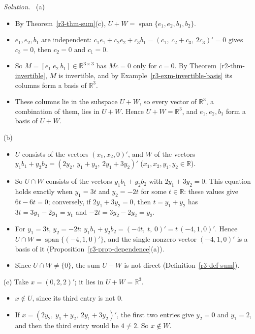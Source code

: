 \documentclass[12pt]{article}
\newcommand{\R}{\mathbb R}
\DeclareMathOperator{\Span}{span}
\theoremstyle{definition}
\newenvironment{solution}{\par\noindent\textit{Solution.}\ }{\par\smallskip}
\begin{document}
\begin{solution}
(a)
\begin{itemize}
\item By Theorem~\ref{r3-thm-sum}(c), \(U+W=\Span\{e_1,e_2,b_1,b_2\}\).
\item \(e_1,e_2,b_1\) are independent: \(c_1e_1+c_2e_2+c_3b_1=(c_1,\ c_2+c_3,\ 2c_3)'=0\) gives
\(c_3=0\), then \(c_2=0\) and \(c_1=0\).
\item So \(M=[e_1\ e_2\ b_1]\in\R^{3\times3}\) has \(Mc=0\) only for \(c=0\). By
Theorem~\ref{r2-thm-invertible}, \(M\) is invertible, and by
Example~\ref{r3-exm-invertible-basis} its columns form a basis of \(\R^3\).
\item These columns lie in the subspace \(U+W\), so every vector of \(\R^3\), a combination of
them, lies in \(U+W\). Hence \(U+W=\R^3\), and \(e_1,e_2,b_1\) form a basis of \(U+W\).
\end{itemize}
(b)
\begin{itemize}
\item \(U\) consists of the vectors \((x_1,x_2,0)'\), and \(W\) of the vectors
\(y_1b_1+y_2b_2=(2y_2,\ y_1+y_2,\ 2y_1+3y_2)'\) (\(x_1,x_2,y_1,y_2\in\R\)).
\item So \(U\cap W\) consists of the vectors \(y_1b_1+y_2b_2\) with \(2y_1+3y_2=0\). This
equation holds exactly when \(y_1=3t\) and \(y_2=-2t\) for some \(t\in\R\): these values give
\(6t-6t=0\); conversely, if \(2y_1+3y_2=0\), then \(t=y_1+y_2\) has \(3t=3y_1-2y_1=y_1\) and
\(-2t=3y_2-2y_2=y_2\).
\item For \(y_1=3t\), \(y_2=-2t\): \(y_1b_1+y_2b_2=(-4t,\ t,\ 0)'=t\,(-4,1,0)'\). Hence
\(U\cap W=\Span\{(-4,1,0)'\}\), and the single nonzero vector \((-4,1,0)'\) is a basis of it
(Proposition~\ref{r3-prop-dependence}(a)).
\item Since \(U\cap W\ne\{0\}\), the sum \(U+W\) is not direct (Definition~\ref{r3-def-sum}).
\end{itemize}
(c) Take \(x=(0,2,2)'\); it lies in \(U+W=\R^3\).
\begin{itemize}
\item \(x\notin U\), since its third entry is not \(0\).
\item If \(x=(2y_2,\ y_1+y_2,\ 2y_1+3y_2)'\), the first two entries give \(y_2=0\) and \(y_1=2\),
and then the third entry would be \(4\ne2\). So \(x\notin W\).
\end{itemize}
\end{solution}
\end{document}
